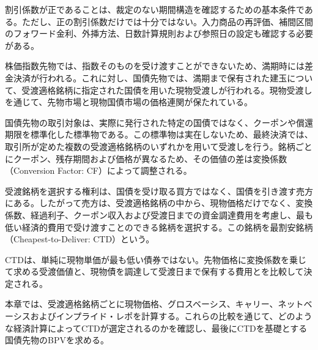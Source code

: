 \documentclass[
  letterpaper,
  DIV=11,
  numbers=noendperiod]{scrreprt}
\newenvironment{Shaded}{\begin{snugshade}}{\end{snugshade}}
\newcommand{\AttributeTok}[1]{\textcolor[rgb]{0.40,0.45,0.13}{#1}}
\newcommand{\ConstantTok}[1]{\textcolor[rgb]{0.56,0.35,0.01}{#1}}
\newcommand{\FunctionTok}[1]{\textcolor[rgb]{0.28,0.35,0.67}{#1}}
\newcommand{\NormalTok}[1]{\textcolor[rgb]{0.00,0.23,0.31}{#1}}
\newcommand{\SpecialCharTok}[1]{\textcolor[rgb]{0.37,0.37,0.37}{#1}}
\newcommand{\StringTok}[1]{\textcolor[rgb]{0.13,0.47,0.30}{#1}}
\begin{document}
割引係数が正であることは、裁定のない期間構造を確認するための基本条件である。ただし、正の割引係数だけでは十分ではない。入力商品の再評価、補間区間のフォワード金利、外挿方法、日数計算規則および参照日の設定も確認する必要がある。

株価指数先物では、指数そのものを受け渡すことができないため、満期時には差金決済が行われる。これに対し、国債先物では、満期まで保有された建玉について、受渡適格銘柄に指定された国債を用いた現物受渡しが行われる。現物受渡しを通じて、先物市場と現物国債市場の価格連関が保たれている。

国債先物の取引対象は、実際に発行された特定の国債ではなく、クーポンや償還期限を標準化した標準物である。この標準物は実在しないため、最終決済では、取引所が定めた複数の受渡適格銘柄のいずれかを用いて受渡しを行う。銘柄ごとにクーポン、残存期間および価格が異なるため、その価値の差は変換係数（Conversion
Factor: CF）によって調整される。

受渡銘柄を選択する権利は、国債を受け取る買方ではなく、国債を引き渡す売方にある。したがって売方は、受渡適格銘柄の中から、現物価格だけでなく、変換係数、経過利子、クーポン収入および受渡日までの資金調達費用を考慮し、最も低い経済的費用で受け渡すことのできる銘柄を選択する。この銘柄を最割安銘柄（Cheapest-to-Deliver:
CTD）という。

CTDは、単純に現物単価が最も低い債券ではない。先物価格に変換係数を乗じて求める受渡価値と、現物債を調達して受渡日まで保有する費用とを比較して決定される。

本章では、受渡適格銘柄ごとに現物価格、グロスベーシス、キャリー、ネットベーシスおよびインプライド・レポを計算する。これらの比較を通じて、どのような経済計算によってCTDが選定されるのかを確認し、最後にCTDを基礎とする国債先物のBPVを求める。

\begin{Shaded}
\end{Shaded}
\end{document}
